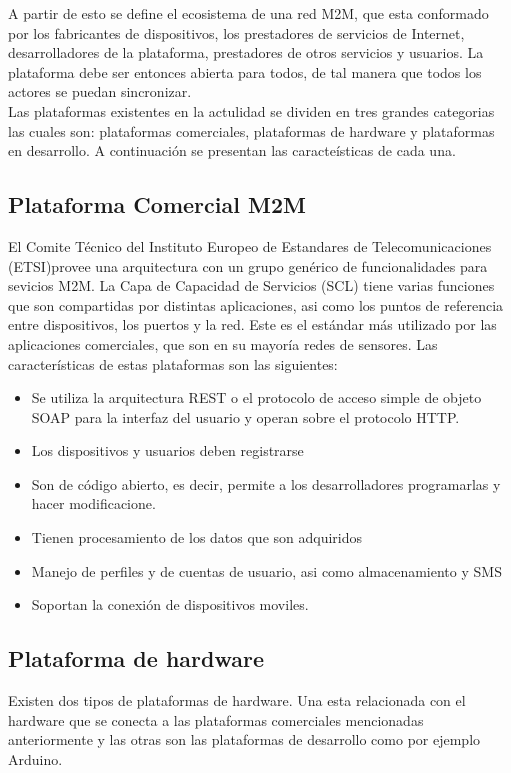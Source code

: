 \documentclass[journal]{IEEEtran}
\begin{document}
A partir de esto se define el ecosistema de una red M2M, que esta conformado por los fabricantes de dispositivos, los prestadores de servicios de Internet, desarrolladores de la plataforma, prestadores de otros servicios y usuarios. La plataforma debe ser entonces abierta para todos, de tal manera que todos los actores se puedan sincronizar.\\

Las plataformas existentes en la actulidad se dividen en tres grandes categorias las cuales son: plataformas comerciales, plataformas de hardware y plataformas en desarrollo. A continuaci\'on se presentan las caracte\'isticas de cada una.

\subsection{Plataforma Comercial M2M}
El Comite T\'ecnico del Instituto Europeo de Estandares de Telecomunicaciones (ETSI)provee una arquitectura con un grupo gen\'erico de funcionalidades para sevicios M2M. La Capa de Capacidad de Servicios (SCL) tiene varias funciones que son compartidas por distintas aplicaciones, asi como los puntos de referencia entre dispositivos, los puertos y la red. Este es el est\'andar m\'as utilizado por las aplicaciones comerciales, que son en su mayor\'ia redes de sensores. Las caracter\'isticas de estas plataformas son las siguientes:
\begin{itemize}
\item Se utiliza la arquitectura REST o el protocolo de acceso simple de objeto SOAP para la interfaz del usuario y operan sobre el protocolo HTTP.
\item Los dispositivos y usuarios deben registrarse
\item Son de c\'odigo abierto, es decir, permite a los desarrolladores programarlas y hacer modificacione.
\item Tienen procesamiento de los datos que son adquiridos
\item Manejo de perfiles y de cuentas de usuario, asi como almacenamiento y SMS
\item Soportan la conexi\'on de dispositivos moviles.

\end{itemize}

\subsection{Plataforma de hardware}
Existen dos tipos de plataformas de hardware. Una esta relacionada con el hardware que se conecta a las plataformas comerciales mencionadas anteriormente y las otras son las plataformas de desarrollo como por ejemplo Arduino.
\end{document}
